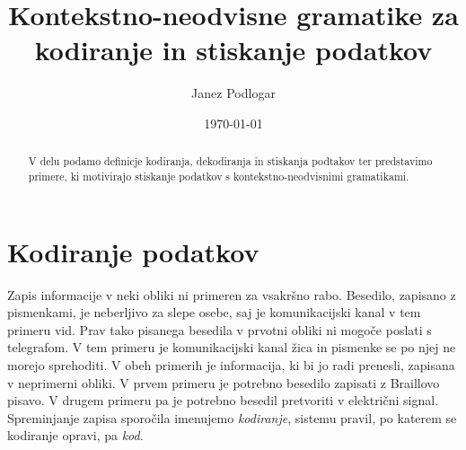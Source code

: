\documentclass{amsart}
\title{Kontekstno-neodvisne gramatike za kodiranje in stiskanje podatkov}
\author{Janez Podlogar}
\date{\today}
\theoremstyle{definition} %
\theoremstyle{plain} %
\begin{document}
\begin{abstract}

    V delu podamo definicje kodiranja, dekodiranja in stiskanja podtakov ter predstavimo
    primere, ki motivirajo stiskanje podatkov s kontekstno-neodvisnimi gramatikami.

\end{abstract}

\maketitle

\section{Kodiranje podatkov}

Zapis informacije v neki obliki ni primeren za vsakršno rabo. Besedilo, zapisano z 
pismenkami, je neberljivo za slepe osebe, saj je komunikacijski kanal v tem primeru
vid. Prav tako pisanega besedila v prvotni obliki ni mogoče poslati s telegrafom. V tem
primeru je komunikacijski kanal žica in pismenke se po njej ne morejo sprehoditi. V obeh 
primerih je informacija, ki bi jo radi prenesli, zapisana v neprimerni obliki. V prvem 
primeru je potrebno besedilo zapisati z Braillovo pisavo. V drugem primeru pa je
potrebno besedil pretvoriti v električni signal. Spreminjanje zapisa sporočila
imenujemo \textit{kodiranje}, sistemu pravil, po katerem se kodiranje opravi,
pa \textit{kod}. 
\end{document}
